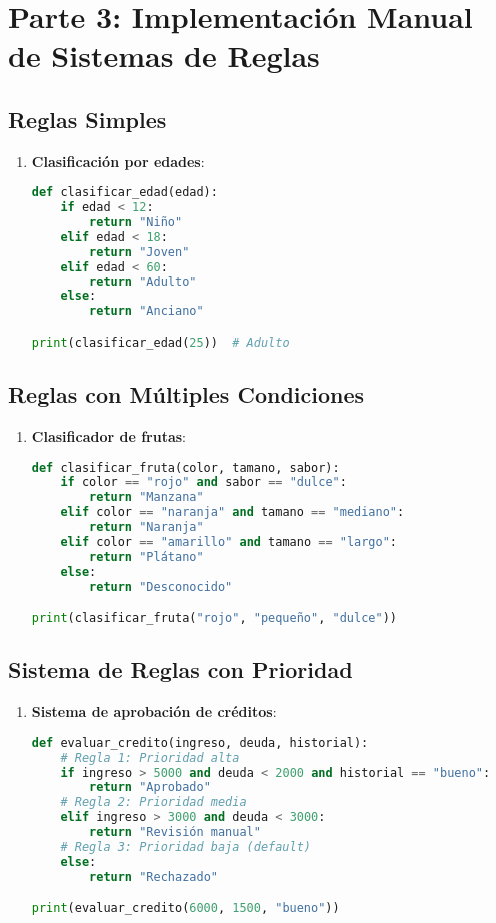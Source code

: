 \documentclass[a4paper,12pt]{article}
\begin{document}
\section{Parte 3: Implementación Manual de Sistemas de Reglas}

\subsection{Reglas Simples}
\begin{enumerate}
    \item \textbf{Clasificación por edades}:
    \begin{lstlisting}[language=Python]
def clasificar_edad(edad):
    if edad < 12:
        return "Niño"
    elif edad < 18:
        return "Joven"
    elif edad < 60:
        return "Adulto"
    else:
        return "Anciano"

print(clasificar_edad(25))  # Adulto
    \end{lstlisting}
\end{enumerate}

\subsection{Reglas con Múltiples Condiciones}
\begin{enumerate}
    \item \textbf{Clasificador de frutas}:
    \begin{lstlisting}[language=Python]
def clasificar_fruta(color, tamano, sabor):
    if color == "rojo" and sabor == "dulce":
        return "Manzana"
    elif color == "naranja" and tamano == "mediano":
        return "Naranja"
    elif color == "amarillo" and tamano == "largo":
        return "Plátano"
    else:
        return "Desconocido"

print(clasificar_fruta("rojo", "pequeño", "dulce"))
    \end{lstlisting}
\end{enumerate}

\subsection{Sistema de Reglas con Prioridad}
\begin{enumerate}
    \item \textbf{Sistema de aprobación de créditos}:
    \begin{lstlisting}[language=Python]
def evaluar_credito(ingreso, deuda, historial):
    # Regla 1: Prioridad alta
    if ingreso > 5000 and deuda < 2000 and historial == "bueno":
        return "Aprobado"
    # Regla 2: Prioridad media
    elif ingreso > 3000 and deuda < 3000:
        return "Revisión manual"
    # Regla 3: Prioridad baja (default)
    else:
        return "Rechazado"

print(evaluar_credito(6000, 1500, "bueno"))
    \end{lstlisting}
\end{enumerate}
\end{document}
